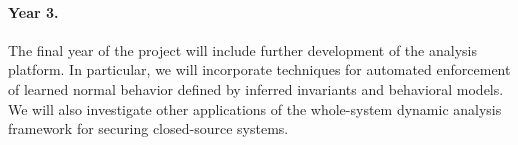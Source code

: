 \documentclass[letterpaper,twoside,11pt,headings=small]{scrartcl}
\begin{document}
\paragraph{Year 3.} The final year of the project will include further
development of the analysis platform.  In particular, we will incorporate
techniques for automated enforcement of learned normal behavior defined by
inferred invariants and behavioral models.  We will also investigate other
applications of the whole-system dynamic analysis framework for securing
closed-source systems.


\newpage
{}
\setcounter{page}{1}
\setcounter{section}{0}



\end{document}

